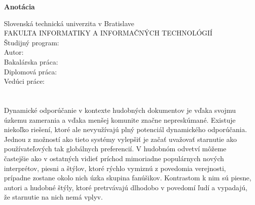 \newpage
\thispagestyle{plain}
\begin{center}
\begin{Large}
\textbf{Anotácia} \\
\end{Large}
\end{center}
Slovenská technická univerzita v Bratislave \\
FAKULTA INFORMATIKY A INFORMAČNÝCH TECHNOLÓGIÍ \\
\noindent
Študijný program: \Program \\
\noindent
Autor: \Author \\
{
    {Bakalárska práca: }\Title \\
}
{
    {Diplomová práca: }\Title \\
}
Vedúci práce: \Supervisor \\
\Month{ }\Year \\
\noindent
\\
Dynamické odporúčanie v kontexte hudobných dokumentov je vďaka svojmu úzkemu zamerania a vďaka menšej komunite značne nepreskúmané. Existuje niekoľko riešení, ktoré ale nevyužívajú plný potenciál dynamického odporúčania. Jednou z možností ako tieto systémy vylepšiť je začať uvažovať starnutie ako používateľových tak globálnych preferencií. V hudobnóm odvetví môžeme častejšie ako v ostatných vidieť príchod mimoriadne populárnych nových interprétov, piesni a štýlov, ktoré rýchlo vymiznú z povedomia verejnosti, prípadne zostane okolo nich úzka skupina fanúšikov. Kontrastom k nim sú piesne, autori a hudobné štýly, ktoré pretrvávajú dlhodobo v povedomí ľudí a vypadajú, že starnutie na nich nemá vplyv. \newpage

